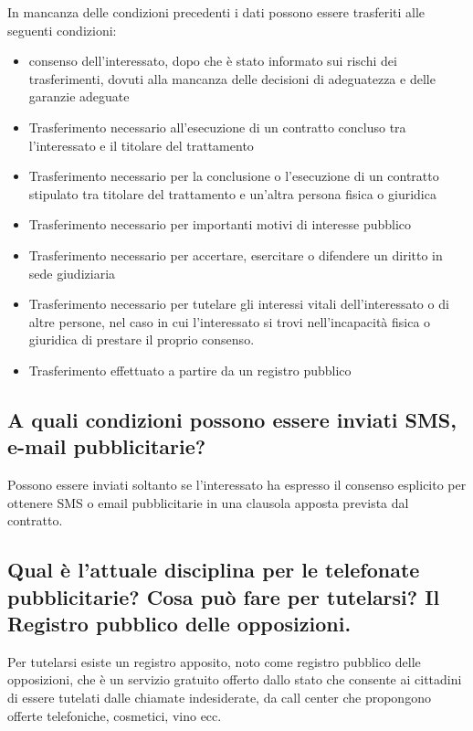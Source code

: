 In mancanza delle condizioni precedenti i dati possono essere trasferiti alle seguenti condizioni:
\begin{itemize}
    \item consenso dell'interessato, dopo che è stato informato sui rischi dei
        trasferimenti, dovuti alla mancanza delle decisioni di adeguatezza e
        delle garanzie adeguate
    \item Trasferimento necessario all'esecuzione di un contratto concluso tra
        l'interessato e il titolare del trattamento
    \item Trasferimento necessario per la conclusione o l'esecuzione di un
        contratto stipulato tra titolare del trattamento e un'altra persona
        fisica o giuridica
    \item Trasferimento necessario per importanti motivi di interesse pubblico
    \item Trasferimento necessario per accertare, esercitare o difendere un
        diritto in sede giudiziaria
    \item Trasferimento necessario per tutelare gli interessi vitali
        dell'interessato o di altre persone, nel caso in cui l'interessato si
        trovi nell'incapacità fisica o giuridica di prestare il proprio
        consenso.
    \item Trasferimento effettuato a partire da un registro pubblico
\end{itemize}
\subsection{A quali condizioni possono essere inviati SMS, e-mail pubblicitarie?}
Possono essere inviati soltanto se l'interessato ha espresso il consenso
esplicito per ottenere SMS o email pubblicitarie in una clausola apposta
prevista dal contratto.

\subsection{Qual è l'attuale disciplina per le telefonate pubblicitarie? Cosa
può fare per tutelarsi? Il Registro pubblico delle opposizioni.}

Per tutelarsi esiste un registro apposito, noto come registro pubblico delle
opposizioni, che è un servizio gratuito offerto dallo stato che consente ai
cittadini di essere tutelati dalle chiamate indesiderate, da call center che
propongono offerte telefoniche, cosmetici, vino ecc.

